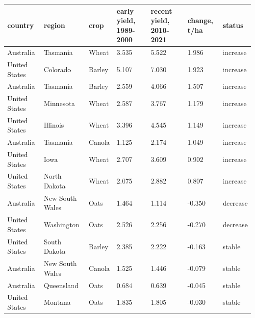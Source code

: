 \begin{tabular}{lllllll}
\hline
country & region & crop & early yield, 1989-2000 & recent yield, 2010-2021 & change, t/ha & status \\
\hline
Australia & Tasmania & Wheat & 3.535 & 5.522 & 1.986 & increase \\
United States & Colorado & Barley & 5.107 & 7.030 & 1.923 & increase \\
Australia & Tasmania & Barley & 2.559 & 4.066 & 1.507 & increase \\
United States & Minnesota & Wheat & 2.587 & 3.767 & 1.179 & increase \\
United States & Illinois & Wheat & 3.396 & 4.545 & 1.149 & increase \\
Australia & Tasmania & Canola & 1.125 & 2.174 & 1.049 & increase \\
United States & Iowa & Wheat & 2.707 & 3.609 & 0.902 & increase \\
United States & North Dakota & Wheat & 2.075 & 2.882 & 0.807 & increase \\
Australia & New South Wales & Oats & 1.464 & 1.114 & -0.350 & decrease \\
United States & Washington & Oats & 2.526 & 2.256 & -0.270 & decrease \\
United States & South Dakota & Barley & 2.385 & 2.222 & -0.163 & stable \\
Australia & New South Wales & Canola & 1.525 & 1.446 & -0.079 & stable \\
Australia & Queensland & Oats & 0.684 & 0.639 & -0.045 & stable \\
United States & Montana & Oats & 1.835 & 1.805 & -0.030 & stable \\
\hline
\end{tabular}
